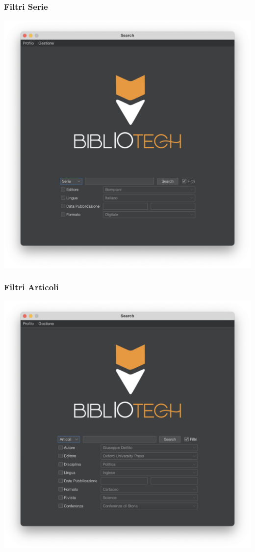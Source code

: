 \subsubsection{Filtri Serie}
\includegraphics[scale=0.25, center]{Immagini/Schermate/Search/SearchPage-FiltriSerie.png}
\subsubsection{Filtri Articoli}
\includegraphics[scale=0.25, center]{Immagini/Schermate/Search/SearchPage-FiltriArticoli.png}
